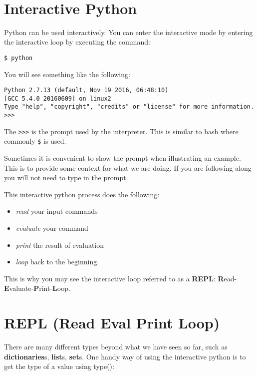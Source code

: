 \FILENAME\

\section{Interactive Python}\label{interactive-python}

Python can be used interactively. You can enter the interactive mode
by entering the interactive loop by executing the command:

\begin{lstlisting}
$ python
\end{lstlisting}

You will see something like the following:

\begin{lstlisting}
Python 2.7.13 (default, Nov 19 2016, 06:48:10)
[GCC 5.4.0 20160609] on linux2
Type "help", "copyright", "credits" or "license" for more information.
>>>
\end{lstlisting}

The \verb|>>>| is the prompt used by the interpreter. This is similar to
bash where commonly \verb|$| is used.

Sometimes it is convenient to show the prompt when illustrating an
example. This is to provide some context for what we are doing. If you
are following along you will not need to type in the prompt.

This interactive python process does the following:

\begin{itemize}
\item
  \emph{read} your input commands
\item
  \emph{evaluate} your command
\item
  \emph{print} the result of evaluation
\item
  \emph{loop} back to the beginning.
\end{itemize}

This is why you may see the interactive loop referred to as a
\textbf{REPL}:
\textbf{R}ead-\textbf{E}valuate-\textbf{P}rint-\textbf{L}oop.

\section{REPL (Read Eval Print Loop)}\label{repl-read-eval-print-loop}

There are many different types beyond what we have seen so far, such as
\textbf{dictionaries}s, \textbf{list}s, \textbf{set}s. One handy way of
using the interactive python is to get the type of a value using
type():

